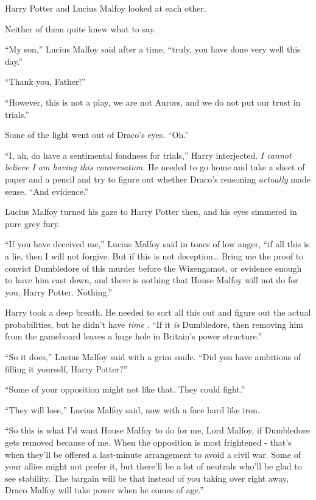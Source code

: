 Harry Potter and Lucius Malfoy looked at each other.

Neither of them quite knew what to say.

``My son,'' Lucius Malfoy said after a time, ``truly, you have done very
well this day.''

``Thank you, Father!''

``However, this is not a play, we are not Aurors, and we do not put our
trust in trials.''

Some of the light went out of Draco's eyes. ``Oh.''

``I, ah, do have a sentimental fondness for trials,'' Harry interjected.
\emph{I cannot believe I am having this conversation.} He needed to go
home and take a sheet of paper and a pencil and try to figure out
whether Draco's reasoning \emph{actually} made sense. ``And evidence.''

Lucius Malfoy turned his gaze to Harry Potter then, and his eyes
simmered in pure grey fury.

``If you have deceived me,'' Lucius Malfoy said in tones of low anger,
``if all this is a lie, then I will not forgive. But if this is not
deception\ldots{} Bring me the proof to convict Dumbledore of this
murder before the Wizengamot, or evidence enough to have him cast down,
and there is nothing that House Malfoy will not do for you, Harry
Potter. Nothing.''

Harry took a deep breath. He needed to sort all this out and figure out
the actual probabilities, but he didn't have \emph{time} . ``If it
\emph{is} Dumbledore, then removing him from the gameboard leaves a huge
hole in Britain's power structure.''

``So it does,'' Lucius Malfoy said with a grim smile. ``Did you have
ambitions of filling it yourself, Harry Potter?''

``Some of your opposition might not like that. They could fight.''

``They will lose,'' Lucius Malfoy said, now with a face hard like iron.

``So this is what I'd want House Malfoy to do for me, Lord Malfoy, if
Dumbledore gets removed because of me. When the opposition is most
frightened - that's when they'll be offered a last-minute arrangement to
avoid a civil war. Some of your allies might not prefer it, but there'll
be a lot of neutrals who'll be glad to see stability. The bargain will
be that instead of you taking over right away, Draco Malfoy will take
power when he comes of age.''

